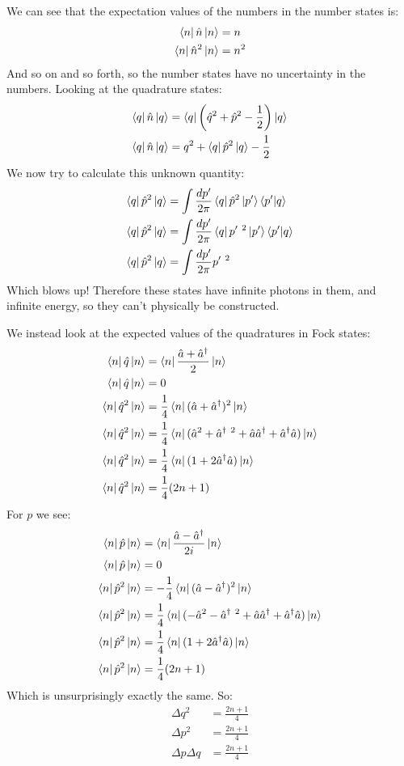 We can see that the expectation values of the numbers in the number states is:
\begin{align*}
	\bra{n}\hat{n}\ket{n} &= n \\
	\bra{n}\hat{n}^2\ket{n} &= n^2
\end{align*}
And so on and so forth, so the number states have no uncertainty in the numbers. Looking at the quadrature states:
\begin{align*}
	\bra{q}\hat{n}\ket{q} &= \bra{q}\left(\hat{q}^2 + \hat{p}^2  - \frac{1}{2}\right)\ket{q} \\
	\bra{q}\hat{n}\ket{q} &= q^2 +\bra{q}\hat{p}^2\ket{q} - \frac{1}{2}
\end{align*}
We now try to calculate this unknown quantity:
\begin{align*}
	\bra{q}\hat{p}^2\ket{q} &= \int \frac{dp'}{2\pi} \bra{q}\hat{p}^2\ket{p'}\bra{p'} \ket{q} \\
	\bra{q}\hat{p}^2\ket{q} &= \int \frac{dp'}{2\pi} \bra{q}p'\ ^2\ket{p'}\bra{p'} \ket{q} \\
	\bra{q}\hat{p}^2\ket{q} &= \int \frac{dp'}{2\pi} p'\ ^2
\end{align*}
Which blows up! Therefore these states have infinite photons in them, and infinite energy, so they can't physically be constructed.

We instead look at the expected values of the quadratures in Fock states:
\begin{align*}
	\bra{n}\hat{q}\ket{n} &= \bra{n} \frac{\hat{a} + \hat{a}^\dagger}{2} \ket{n} \\
	\bra{n}\hat{q}\ket{n} &= 0 \\
	\bra{n}\hat{q}^2\ket{n} &= \frac{1}{4}\bra{n}(\hat{a} + \hat{a}^\dagger)^2\ket{n} \\
	\bra{n}\hat{q}^2\ket{n} &= \frac{1}{4}\bra{n}(\hat{a}^2 + \hat{a}^\dagger\ ^2 + \hat{a}\hat{a}^\dagger + \hat{a}^\dagger\hat{a})\ket{n} \\
	\bra{n}\hat{q}^2\ket{n} &= \frac{1}{4}\bra{n}(1 + 2\hat{a}^\dagger\hat{a})\ket{n} \\
	\bra{n}\hat{q}^2\ket{n} &= \frac{1}{4}(2n+1)
\end{align*}
For $p$ we see:
\begin{align*}
	\bra{n}\hat{p}\ket{n} &= \bra{n} \frac{\hat{a} - \hat{a}^\dagger}{2i} \ket{n} \\
	\bra{n}\hat{p}\ket{n} &= 0 \\
	\bra{n}\hat{p}^2\ket{n} &= -\frac{1}{4}\bra{n}(\hat{a} - \hat{a}^\dagger)^2\ket{n} \\
	\bra{n}\hat{p}^2\ket{n} &= \frac{1}{4}\bra{n}(-\hat{a}^2 - \hat{a}^\dagger\ ^2 + \hat{a}\hat{a}^\dagger + \hat{a}^\dagger\hat{a})\ket{n} \\
	\bra{n}\hat{p}^2\ket{n} &= \frac{1}{4}\bra{n}(1 + 2\hat{a}^\dagger\hat{a})\ket{n} \\
	\bra{n}\hat{p}^2\ket{n} &= \frac{1}{4}(2n+1)
\end{align*}
Which is unsurprisingly exactly the same. So:
\begin{align*}
	\Delta q^2 &= \frac{2n +1}{4} \\
	\Delta p^2 &= \frac{2n +1}{4} \\
	\Delta p\Delta q &= \frac{2n +1}{4}
\end{align*}

